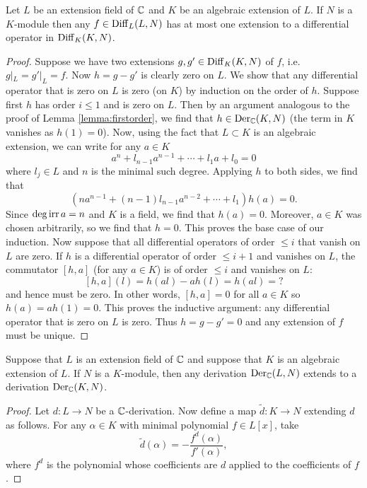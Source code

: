 \begin{lemma}
    Let $L$ be an extension field of $\mathbb{C}$ and $K$ be an algebraic extension of $L$. If
    $N$ is a $K$-module then any $f\in\operatorname{Diff}_L(L,N)$ has at most one extension to a
    differential operator in $\operatorname{Diff}_K(K,N)$.
    \label{lemma:hart1}
\end{lemma}
\begin{proof}
    Suppose we have two extensions $g,g'\in\operatorname{Diff}_K(K,N)$ of $f$, i.e. $g|_L=g'|_L=f$.
    Now $h=g-g'$ is clearly zero on $L$. 
    We show that any differential operator that is zero on $L$ is zero (on $K$) by induction
    on the order of $h$. Suppose first $h$ has order $i\leqslant 1$ and is zero on $L$.
    Then by an argument analogous to the proof of Lemma \ref{lemma:firstorder}, we
    find that $h\in\operatorname{Der}_{\mathbb{C}}(K,N)$ (the term in $K$ vanishes as $h(1)=0$). Now, using the
    fact that $L\subset K$ is an algebraic extension, we can write for any $a\in K$
    \[a^n+l_{n-1}a^{n-1}+\cdots+l_1a+l_0=0\]
    where $l_j\in L$ and $n$ is the minimal such degree. Applying $h$ to both sides,
    we find that
    \[\left(na^{n-1}+(n-1)l_{n-1}a^{n-2}+\cdots+l_1\right)h(a)=0.\]
    Since $\deg\operatorname{irr} a=n$ and $K$ is a field, we find that $h(a)=0$. Moreover, $a\in K$
    was chosen arbitrarily, so we find that $h=0$. This proves the base case of our
    induction. Now suppose that all differential operators of order $\leqslant i$ that
    vanish on $L$ are zero. If $h$ is a differential operator of order $\leqslant i+1$
    and vanishes on $L$, the commutator $[h,a]$ (for any $a\in K$) is of order
    $\leqslant i$ and vanishes on $L$: %
    \[ [h,a](l) = h(al)-ah(l) = h(al) = ?\]
    and hence must be zero. In other words, $[h,a]=0$ for all $a\in K$ so $h(a)=ah(1)=0$.
    This proves the inductive argument: any differential operator that is zero on $L$
    is zero. Thus $h=g-g'=0$ and any extension of $f$ must be unique.
\end{proof}

\begin{lemma}
    Suppose that $L$ is an extension field of $\mathbb{C}$ and suppose that $K$ is an algebraic
    extension of $L$. If $N$ is a $K$-module, then any derivation $\operatorname{Der}_{\mathbb{C}}(L,N)$ extends
    to a derivation $\operatorname{Der}_{\mathbb{C}}(K,N)$.
    \label{lemma:conrad}
\end{lemma}
\begin{proof}
    Let $d:L\to N$ be a $\mathbb{C}$-derivation. Now define a map $\tilde d:K\to N$ extending $d$
    as follows. For any $\alpha\in K$ with minimal polynomial $f\in L[x]$, take
    \[\tilde d(\alpha) = -\frac{f^{d}(\alpha)}{f'(\alpha)},\]
    where $f^d$ is the polynomial whose coefficients are $d$ applied to the coefficients
    of $f$. %
\end{proof}

